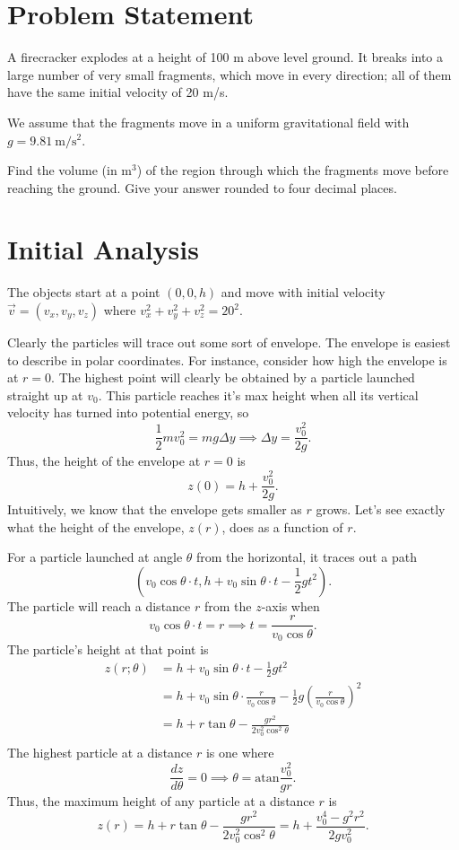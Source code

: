 \documentclass{article}
\newcommand{\atan}{\text{atan}}
\begin{document}
\section*{Problem Statement}
A firecracker explodes at a height of 100 m above level ground. It breaks into
a large number of very small fragments, which move in every direction; all of
them have the same initial velocity of 20 m/s.

We assume that the fragments move in a uniform gravitational field with
$g=9.81~\text{m}/\text{s}^2$.

Find the volume (in m$^3$) of the region through which the fragments move before
reaching the ground. Give your answer rounded to four decimal places.

\section*{Initial Analysis}
The objects start at a point $(0,0,h)$ and move with initial velocity $\vec{v}
= (v_x,v_y,v_z)$ where $v_x^2+v_y^2+v_z^2 = 20^2$.

Clearly the particles will trace out some sort of envelope. The envelope is
easiest to describe in polar coordinates. For instance, consider how high the
envelope is at $r=0$. The highest point will clearly be obtained by a particle
launched straight up at $v_0$. This particle reaches it's max height when all its vertical velocity has turned into potential energy, so
\[ \frac{1}{2}mv_0^2 = mg \Delta y \implies \Delta y = \frac{v_0^2}{2g}. \]
Thus, the height of the envelope at $r=0$ is
\[ z(0) = h + \frac{v_0^2}{2g}. \]
Intuitively, we know that the envelope gets smaller as $r$ grows. Let's see
exactly what the height of the envelope, $z(r)$, does as a function of $r$.

For a particle launched at angle $\theta$ from the horizontal, it traces out
a path
\[ (v_0 \cos \theta \cdot t, h + v_0 \sin\theta \cdot t - \frac{1}{2}gt^2 ). \]
The particle will reach a distance $r$ from the $z$-axis when
\[ v_0 \cos\theta \cdot t = r \implies t = \frac{r}{v_0 \cos\theta}. \]
The particle's height at that point is
\begin{align*}
z(r;\theta) &= h + v_0 \sin \theta \cdot t - \frac{1}{2}gt^2 \\
            &= h + v_0 \sin\theta \cdot \frac{r}{v_0\cos\theta} - \frac{1}{2}g \left(\frac{r}{v_0\cos\theta}\right)^2 \\
            &= h + r\tan \theta - \frac{gr^2}{2v_0^2\cos^2\theta} \\
\end{align*}
The highest particle at a distance $r$ is one where
\[ \frac{dz}{d\theta} = 0 \implies \theta = \atan \frac{v_0^2}{gr}. \]
Thus, the maximum height of any particle at a distance $r$ is
\[ z(r) = h + r \tan \theta - \frac{gr^2}{2v_0^2\cos^2\theta} = h + \frac{v_0^4-g^2r^2}{2gv_0^2}. \]
\end{document}
